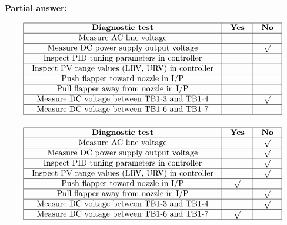 





\noindent
{\bf Partial answer:}


$$\vbox{\offinterlineskip
\halign{\strut
\vrule \quad\hfil # \ \hfil & 
\vrule \quad\hfil # \ \hfil & 
\vrule \quad\hfil # \ \hfil \vrule \cr
\noalign{\hrule}
%
{\bf Diagnostic test} & {\bf Yes} & {\bf No} \cr
%
\noalign{\hrule}
%
Measure AC line voltage &  &  \cr
%
\noalign{\hrule}
%
Measure DC power supply output voltage &  & $\surd$ \cr
%
\noalign{\hrule}
%
Inspect PID tuning parameters in controller &  &  \cr
%
\noalign{\hrule}
%
Inspect PV range values (LRV, URV) in controller &  &  \cr
%
\noalign{\hrule}
%
Push flapper toward nozzle in I/P &  &  \cr
%
\noalign{\hrule}
%
Pull flapper away from nozzle in I/P &  & \cr
%
\noalign{\hrule}
%
Measure DC voltage between TB1-3 and TB1-4 &  & $\surd$ \cr
%
\noalign{\hrule}
%
Measure DC voltage between TB1-6 and TB1-7 &  &  \cr
%
\noalign{\hrule}
} %
}$$ %








$$\vbox{\offinterlineskip
\halign{\strut
\vrule \quad\hfil # \ \hfil & 
\vrule \quad\hfil # \ \hfil & 
\vrule \quad\hfil # \ \hfil \vrule \cr
\noalign{\hrule}
%
{\bf Diagnostic test} & {\bf Yes} & {\bf No} \cr
%
\noalign{\hrule}
%
Measure AC line voltage &  & $\surd$ \cr
%
\noalign{\hrule}
%
Measure DC power supply output voltage &  & $\surd$ \cr
%
\noalign{\hrule}
%
Inspect PID tuning parameters in controller &  & $\surd$ \cr
%
\noalign{\hrule}
%
Inspect PV range values (LRV, URV) in controller &  & $\surd$ \cr
%
\noalign{\hrule}
%
Push flapper toward nozzle in I/P & $\surd$ &  \cr
%
\noalign{\hrule}
%
Pull flapper away from nozzle in I/P &  & $\surd$ \cr
%
\noalign{\hrule}
%
Measure DC voltage between TB1-3 and TB1-4 &  & $\surd$ \cr
%
\noalign{\hrule}
%
Measure DC voltage between TB1-6 and TB1-7 & $\surd$ &  \cr
%
\noalign{\hrule}
} %
}$$ %


